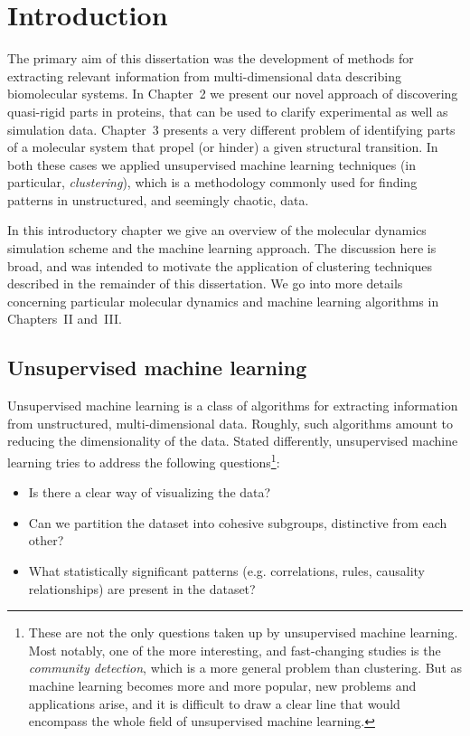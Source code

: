 \documentclass[a4paper,11pt,twoside]{book}%
\begin{document}
 



\tableofcontents

\chapter{Introduction}

The primary aim of this dissertation was the development of methods for extracting relevant information from multi-dimensional data describing biomolecular systems.
In Chapter~2 we present our novel approach of discovering quasi-rigid parts in proteins, that can be used to clarify experimental as well as simulation data.
Chapter~3 presents a very different problem of identifying parts of a molecular system that propel (or hinder) a given structural transition.
In both these cases we applied unsupervised machine learning techniques (in particular, \emph{clustering}), which is a methodology commonly used for finding patterns in unstructured, and seemingly chaotic, data.

In this introductory chapter we give an overview of the molecular dynamics simulation scheme and the machine learning approach.
The discussion here is broad, and was intended to motivate the application of clustering techniques described in the remainder of this dissertation. %
We go into more details concerning particular molecular dynamics and machine learning algorithms in Chapters~II and~III. %

\section{Unsupervised machine learning}


Unsupervised machine learning is a class of algorithms for extracting information from unstructured, multi-dimensional data.
Roughly, such algorithms amount to reducing the dimensionality of the data.
Stated differently, unsupervised machine learning tries to address the following questions\footnote{
These are not the only questions taken up by unsupervised machine learning.
Most notably, one of the more interesting, and fast-changing studies is the \emph{community detection}, which is a more general problem than clustering.
But as machine learning becomes more and more popular, new problems and applications arise, and it is difficult to draw a clear line that would encompass the whole field of unsupervised machine learning.}:
\begin{itemize}
 \item Is there a clear way of visualizing the data?
 \item Can we partition the dataset into cohesive subgroups, distinctive from each other?
 \item What  statistically significant patterns (e.g. correlations, rules, causality relationships) are present in the dataset?
\end{itemize}
\end{document}
